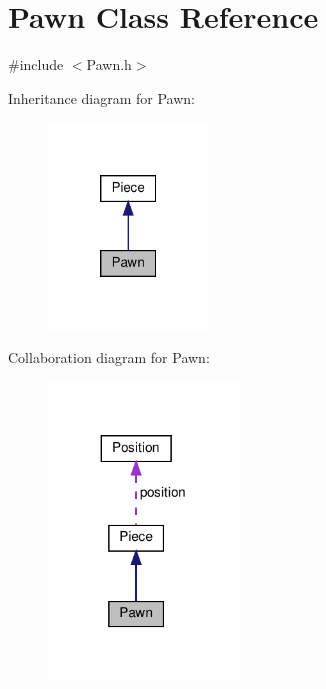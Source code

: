 \hypertarget{class_pawn}{}\section{Pawn Class Reference}
\label{class_pawn}


{\ttfamily \#include $<$Pawn.\+h$>$}



Inheritance diagram for Pawn\+:\nopagebreak
\begin{figure}[H]
\begin{center}
\leavevmode
\includegraphics[width=121pt]{class_pawn__inherit__graph}
\end{center}
\end{figure}


Collaboration diagram for Pawn\+:\nopagebreak
\begin{figure}[H]
\begin{center}
\leavevmode
\includegraphics[width=143pt]{class_pawn__coll__graph}
\end{center}
\end{figure}
